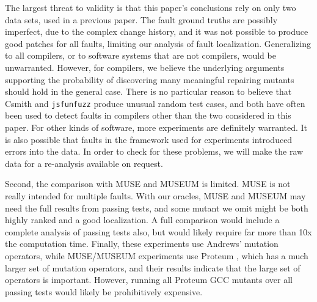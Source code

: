 The largest threat to validity is that this paper's conclusions rely on only two data sets, used in a previous paper.  The fault ground truths are possibly imperfect, due to the complex change history, and it was not possible to produce good patches for all faults, limiting our analysis of fault localization.  Generalizing to all compilers, or to software systems that are not compilers, would be unwarranted.  However, for compilers, we believe the underlying arguments supporting the probability of discovering many meaningful repairing mutants should hold in the general case.  There is no particular reason to believe that Csmith and {\tt jsfunfuzz} produce unusual random test cases, and both have often been used to detect faults in compilers other than the two considered in this paper.  For other kinds of software, more experiments are definitely warranted.  It is also possible that faults in the framework used for experiments introduced errors into the data.  In order to check for these problems, we will make the raw data for a re-analysis available on request.

Second, the comparison with MUSE and MUSEUM is limited.  MUSE is not really intended for multiple faults.  With our oracles, MUSE and MUSEUM may need the full results from passing tests, and some mutant we omit might be both highly ranked and a good localization.  A full comparison would include a complete analysis of passing tests also, but would likely require far more than 10x the computation time.  Finally, these experiments use Andrews' mutation operators, while MUSE/MUSEUM experiments use Proteum \cite{Proteum}, which has a much larger set of mutation operators, and their results indicate that the large set of operators is important.  However, running all Proteum GCC mutants over all passing tests would likely be prohibitively expensive.
